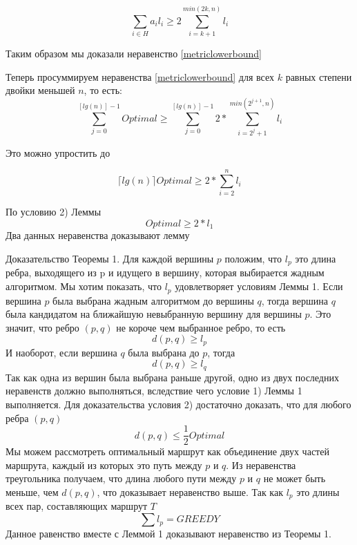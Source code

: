 \documentclass[a4paper, 14pt]{extarticle}
\numberwithin{equation}{section}
\begin{document}
\begin{equation}
	\sum_{i \in H} a_i l_i \geq 2 \sum_{i=k+1}^{min(2k, n)} l_i
	\label{sum}
\end{equation}

Таким образом мы доказали неравенство \eqref{metriclowerbound}

Теперь просуммируем неравенства \eqref{metriclowerbound} для всех $k$ равных степени двойки меньшей $n$, то есть:
\begin{equation}
\sum_{j=0}^{[lg(n)]-1} Optimal \geq \sum_{j=0}^{[lg(n)]-1} 2* \sum_{i=2^j+1}^{min(2^{j+1}, n)} l_i
\end{equation}

Это можно упростить до

\begin{equation}
\lceil lg(n) \rceil Optimal \geq 2* \sum_{i=2}^{n} l_i
\end{equation}

По условию 2) Леммы
\begin{equation}
Optimal \geq 2*l_1
\end{equation}
Два данных неравенства доказывают лемму

Доказательство Теоремы 1. Для каждой  вершины $p$ положим, что $l_p$ это длина ребра, выходящего из p и идущего в вершину, которая выбирается жадным алгоритмом. Мы хотим показать, что $l_p$ удовлетворяет условиям Леммы 1. Если вершина $p$ была выбрана жадным алгоритмом до вершины $q$, тогда вершина $q$ была кандидатом на ближайшую невыбранную вершину для вершины $p$. Это значит, что ребро $(p,q)$ не короче чем выбранное ребро, то есть
\begin{equation}
d(p,q) \geq l_p
\end{equation}
И наоборот, если вершина $q$ была выбрана до $p$, тогда
\begin{equation}
d(p,q) \geq l_q
\end{equation}
Так как одна из вершин была выбрана раньше другой, одно из двух последних неравенств должно выполняться, вследствие чего  условие 1) Леммы 1 выполняется. Для доказательства условия 2) достаточно доказать, что для любого ребра $(p,q)$
\begin{equation}
d(p,q) \leq \frac{1}{2}Optimal
\end{equation}
Мы можем рассмотреть оптимальный маршрут как объединение двух частей маршрута, каждый из которых это путь между $p$ и $q$. Из неравенства треугольника получаем, что длина любого пути между $p$ и $q$ не может быть меньше, чем $d(p,q)$, что доказывает неравенство выше. Так как $l_p$ это длины всех пар, составляющих маршрут $T$
\begin{equation}
\sum l_p = GREEDY
\end{equation}
Данное равенство вместе с Леммой 1 доказывают неравенство из Теоремы 1.\\
\end{document}
